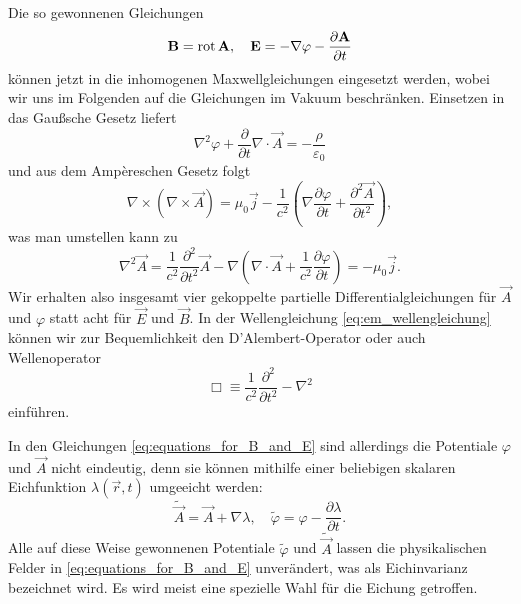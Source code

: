 Die so gewonnenen Gleichungen
\begin{equation}
	\label{eq:equations_for_B_and_E}
	\mathbf{B}=\operatorname{rot} \mathbf{A},\quad \mathbf{E}=-\nabla \varphi -\frac{\partial \mathbf{A}}{\partial t}
\end{equation}
können jetzt in die inhomogenen Maxwellgleichungen eingesetzt werden, wobei wir uns im Folgenden auf die Gleichungen im Vakuum beschränken. Einsetzen in das Gaußsche Gesetz liefert
\begin{equation}
	\label{eq:dgl_phi_A_rho}
	\nabla ^{2}\varphi +\frac{\partial }{\partial t}\nabla \cdot \vec {A}=-\frac{\rho }{\varepsilon _{0}}
\end{equation}
und aus dem Ampèreschen Gesetz folgt
\begin{equation*}
	\nabla \times \left(\nabla \times \vec {A}\right)=\mu _{0}\vec {j}-\frac{1}{c^{2}}\left(\nabla \frac{\partial \varphi }{\partial t}+\frac{\partial ^{2}\vec {A}}{\partial t^{2}}\right),
\end{equation*}
was man umstellen kann zu
\begin{equation}
	\label{eq:em_wellengleichung}
	\nabla ^{2}\vec {A}=\frac{1}{c^{2}}\frac{\partial ^{2}}{\partial t^{2}}\vec {A}-\nabla \left(\nabla \cdot \vec {A}+\frac{1}{c^{2}}\frac{\partial \varphi }{\partial t}\right)=-\mu _{0}\vec {j}.
\end{equation}
Wir erhalten also insgesamt vier gekoppelte partielle Differentialgleichungen für $\vec {A}$ und $\varphi $ statt acht für $\vec {E}$ und $\vec {B}$. In der Wellengleichung \eqref{eq:em_wellengleichung} können wir zur Bequemlichkeit den D’Alembert-Operator oder auch Wellenoperator
\begin{equation}
	\label{eq:wellenoperator_klassisch}
	\Box\equiv\frac{1}{c^{2}}\frac{\partial ^{2}}{\partial t^{2}}-\nabla ^{2}
\end{equation}
einführen.

In den Gleichungen \eqref{eq:equations_for_B_and_E} sind allerdings die Potentiale $\varphi $ und $\vec {A}$ nicht eindeutig, denn sie können mithilfe einer beliebigen skalaren Eichfunktion $\lambda \left(\vec {r},t\right)$ umgeeicht werden:
\begin{equation}
	\label{eq:umeichung}
	\tilde{\vec {A}}=\vec {A}+\nabla \lambda , \quad\tilde{\varphi }=\varphi -\frac{\partial \lambda }{\partial t}.
\end{equation}
Alle auf diese Weise gewonnenen Potentiale $\tilde{\varphi }$ und $\tilde{\vec {A}}$ lassen die physikalischen Felder in \eqref{eq:equations_for_B_and_E} unverändert, was als Eichinvarianz bezeichnet wird. Es wird meist eine spezielle Wahl für die Eichung getroffen.

